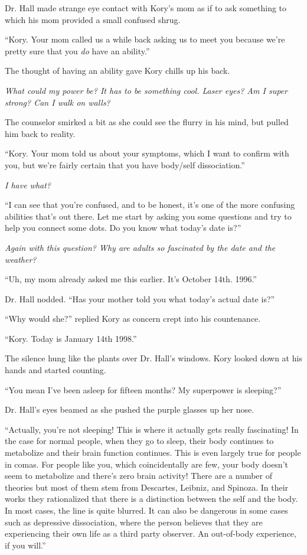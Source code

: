 Dr. Hall made strange eye contact with Kory's mom as if to ask something to which his mom provided a small confused shrug.

``Kory. Your mom called us a while back asking us to meet you because we're pretty sure that you \textit{do} have an ability.''

The thought of having an ability gave Kory chills up his back.

\textit{What could my power be? It has to be something cool. Laser eyes? Am I super strong? Can I walk on walls?}

The counselor smirked a bit as she could see the flurry in his mind, but pulled him back to reality.

``Kory. Your mom told us about your symptoms, which I want to confirm with you, but we're fairly certain that you have body/self dissociation.''

\textit{I have what?}

``I can see that you're confused, and to be honest, it's one of the more confusing abilities that's out there. Let me start by asking you some questions and try to help you connect some dots. Do you know what today's date is?''

\textit{Again with this question? Why are adults so fascinated by the date and the weather?}

``Uh, my mom already asked me this earlier. It's October 14th. 1996.''

Dr. Hall nodded. ``Has your mother told you what today's actual date is?''

``Why would she?'' replied Kory as concern crept into his countenance.

``Kory. Today is January 14th 1998.''

The silence hung like the plants over Dr. Hall's windows. Kory looked down at his hands and started counting.

``You mean I've been asleep for fifteen months? My superpower is sleeping?''

Dr. Hall's eyes beamed as she pushed the purple glasses up her nose.

``Actually, you're not sleeping! This is where it actually gets really fascinating! In the case for normal people, when they go to sleep, their body continues to metabolize and their brain function continues. This is even largely true for people in comas. For people like you, which coincidentally are few, your body doesn't seem to metabolize and there's zero brain activity! There are a number of theories but most of them stem from Descartes, Leibniz, and Spinoza. In their works they rationalized that there is a distinction between the self and the body. In most cases, the line is quite blurred. It can also be dangerous in some cases such as depressive dissociation, where the person believes that they are experiencing their own life as a third party observer. An out-of-body experience, if you will.''

